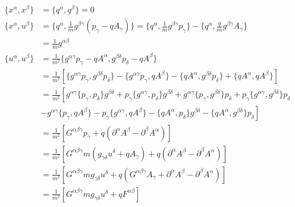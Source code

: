 \documentclass[11pt]{article}
\begin{document}
\begin{equation}
\begin{aligned}
\{x^\alpha, x^\beta\} &= \{q^\alpha, q^\beta\} = 0 \\
\{x^\alpha, u^\beta\} &= \{q^\alpha, \frac{1}{m} g^{\beta\gamma}(p_\gamma - q A_\gamma)\} = \{q^\alpha, \frac{1}{m} g^{\beta\gamma} p_\gamma\} - \{q^\alpha, \frac{q}{m} g^{\beta\gamma} A_\gamma\} \\
&= \frac{1}{m} g^{\alpha\beta} \\
\{u^\alpha, u^\beta\} &= \frac{1}{m^2} \{g^{\alpha \gamma} p_\gamma - q A^\alpha, g^{\beta \delta} p_\delta - q A^\beta\} \\
&= \frac{1}{m^2}\left[ \{g^{\alpha \gamma} p_\gamma, g^{\beta \delta} p_\delta\} - \{g^{\alpha \gamma} p_\gamma, q A^\beta\} - \{q A^\alpha , g^{\beta \delta} p_\delta \} + \{q A^\alpha , q A^\beta\} \right]\\
&= \frac{1}{m^2}\left[ g^{\alpha \gamma} \{p_\gamma, p_\delta\} g^{\beta \delta} + p_\gamma \{g^{\alpha \gamma}, p_\delta\} g^{\beta \delta} + g^{\alpha \gamma} \{p_\gamma, g^{\beta \delta}\} p_\delta + p_\gamma \{g^{\alpha \gamma}, g^{\beta \delta}\} p_\delta \right.\\
&\left. - g^{\alpha \gamma} \{p_\gamma, q A^\beta\} - p_\gamma \{g^{\alpha \gamma} , q A^\beta\} - \{q A^\alpha , p_\delta \} g^{\beta \delta} - \{q A^\alpha , g^{\beta \delta} \} p_\delta \right]\\
&= \frac{1}{m^2}\left[ G^{\alpha\beta\gamma} p_\gamma  + q (\partial^\alpha A^\beta - \partial^\beta A^\alpha) \right] \\
&= \frac{1}{m^2}\left[ G^{\alpha \beta \gamma} m ( g_{\gamma \delta} u^\delta + q A_\gamma ) + q (\partial^\alpha A^\beta - \partial^\beta A^\alpha) \right] \\
&= \frac{1}{m^2}\left[ G^{\alpha \beta \gamma} m g_{\gamma \delta} u^\delta + q (G^{\alpha \beta \gamma} A_\gamma + \partial^\alpha A^\beta - \partial^\beta A^\alpha) \right] \\
&= \frac{1}{m^2}\left[ G^{\alpha \beta \gamma} m g_{\gamma \delta} u^\delta +  q F^{\alpha \beta} \right] \\
\end{aligned}
\end{equation}
\end{document}
